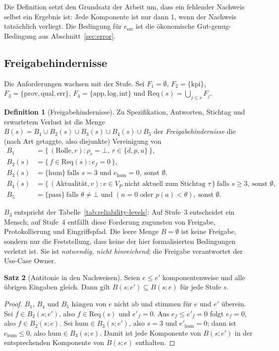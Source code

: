 \documentclass[a4paper,12pt]{article}
\theoremstyle{definition}
\newtheorem{definition}{Definition}[section]
\newtheorem{satz}[definition]{Satz}
\begin{document}
Die Definition setzt den Grundsatz der Arbeit um, dass ein fehlender Nachweis selbst ein Ergebnis ist: Jede Komponente ist nur dann $1$, wenn der Nachweis tatsächlich vorliegt. Die Bedingung für $e_{\mathrm{err}}$ ist die ökonomische Gut-genug-Bedingung aus Abschnitt~\ref{sec:error}.

\subsection{Freigabehindernisse}

Die Anforderungen wachsen mit der Stufe. Sei $F_1=\emptyset$, $F_2=\{\mathrm{kpi}\}$, $F_3=\{\mathrm{prov},\mathrm{qual},\mathrm{err}\}$, $F_4=\{\mathrm{app},\mathrm{log},\mathrm{int}\}$ und $\mathrm{Req}(s)=\bigcup_{j\le s}F_j$.

\begin{definition}[Freigabehindernisse]\label{def:blockers}
Zu Spezifikation, Antworten, Stichtag und erwartetem Verlust ist die Menge $B(s)=B_1\cup B_2(s)\cup B_3(s)\cup B_4(s)\cup B_5$ der \emph{Freigabehindernisse} die (nach Art getaggte, also disjunkte) Vereinigung von
\begin{align*}
B_1&=\{\,(\mathrm{Rolle},r): \rho_r=\bot,\ r\in\{d,p,u\}\,\},\\
B_2(s)&=\{\,f\in\mathrm{Req}(s): e_f=0\,\},\\
B_3(s)&=\{\mathrm{hum}\}\ \text{falls } s=3\text{ und }e_{\mathrm{hum}}=0,\ \text{sonst }\emptyset,\\
B_4(s)&=\{\,(\mathrm{Aktualität},v): v\in V_P\text{ nicht aktuell zum Stichtag }\tau\,\}\ \text{falls }s\ge 3,\ \text{sonst }\emptyset,\\
B_5&=\{\mathrm{pass}\}\ \text{falls }\theta\neq\bot\text{ und }(n=0\text{ oder }p(a)<\theta),\ \text{sonst }\emptyset.
\end{align*}
\end{definition}

$B_3$ entspricht der Tabelle~\ref{tab:reliability-levels}: Auf Stufe~3 entscheidet ein Mensch; auf Stufe~4 entfällt diese Forderung zugunsten von Freigabe, Protokollierung und Eingriffspfad. Die leere Menge $B=\emptyset$ ist keine Freigabe, sondern nur die Feststellung, dass keine der hier formalisierten Bedingungen verletzt ist. Sie ist \emph{notwendig, nicht hinreichend}; die Freigabe verantwortet der Use-Case Owner.

\begin{satz}[Antitonie in den Nachweisen]\label{thm:antitone}
Seien $e\le e'$ komponentenweise und alle übrigen Eingaben gleich. Dann gilt $B(s;e')\subseteq B(s;e)$ für jede Stufe $s$.
\end{satz}
\begin{proof}
$B_1$, $B_4$ und $B_5$ hängen von $e$ nicht ab und stimmen für $e$ und $e'$ überein. Sei $f\in B_2(s;e')$, also $f\in\mathrm{Req}(s)$ und $e'_f=0$. Aus $e_f\le e'_f=0$ folgt $e_f=0$, also $f\in B_2(s;e)$. Sei $\mathrm{hum}\in B_3(s;e')$, also $s=3$ und $e'_{\mathrm{hum}}=0$; dann ist $e_{\mathrm{hum}}\le 0$, also $\mathrm{hum}\in B_3(s;e)$. Damit ist jede Komponente von $B(s;e')$ in der entsprechenden Komponente von $B(s;e)$ enthalten.
\end{proof}
\end{document}
